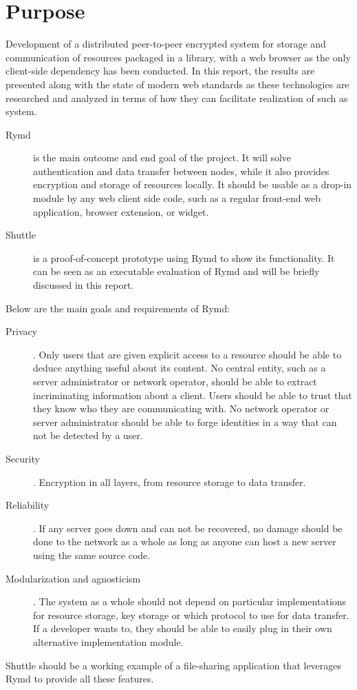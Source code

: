 \section{Purpose}\label{sec:purpose}


Development of a distributed peer-to-peer encrypted system for storage and communication of resources packaged in a library, with a web browser as the only client-side dependency has been conducted. In this report, the results are presented along with the state of modern web standards as these technologies are researched and analyzed in terms of how they can facilitate realization of such as system.

\begin{description}
\item[Rymd] is the main outcome and end goal of the project. It will solve authentication and data transfer between nodes, while it also provides encryption and storage of resources locally. It should be usable as a drop-in module by any web client side code, such as a regular front-end web application, browser extension, or widget.
\item[Shuttle] is a proof-of-concept prototype using Rymd to show its functionality. It can be seen as an executable evaluation of Rymd and will be briefly discussed in this report.
\end{description}

Below are the main goals and requirements of Rymd:

\begin{description}
  \item[Privacy]. Only users that are given explicit access to a resource should be able to deduce anything useful about its content. No central entity, such as a server administrator or network operator, should be able to extract incriminating information about a client. Users should be able to trust that they know who they are communicating with. No network operator or server administrator should be able to forge identities in a way that can not be detected by a user.

\item[Security]. Encryption in all layers, from resource storage to data transfer.

\item[Reliability]. If any server goes down and can not be recovered, no damage should be done to the network as a whole as long as anyone can host a new server using the same source code.

\item[Modularization and agnosticism]. The system as a whole should not depend on particular implementations for resource storage, key storage or which protocol to use for data transfer. If a developer wants to, they should be able to easily plug in their own alternative implementation module.

\end{description}

Shuttle should be a working example of a file-sharing application that leverages Rymd to provide all these features.
